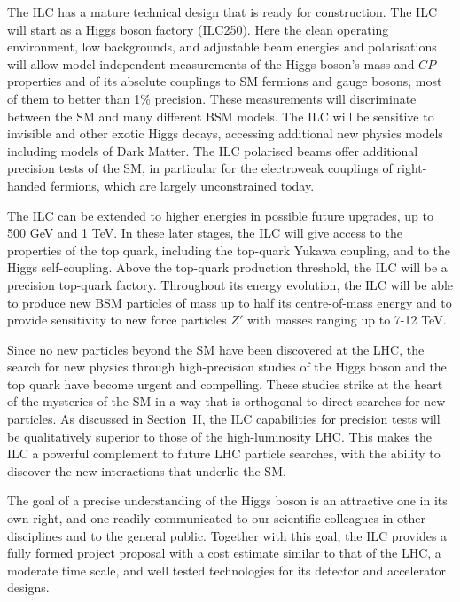 \documentclass[%
 reprint,
 amsmath,amssymb,
 aps,
]{revtex4-1}
\begin{document}
The ILC has a mature technical design
that is
 ready for construction. The ILC will start as a Higgs boson factory
 (ILC250).  Here the clean operating environment, low backgrounds, and
adjustable beam energies and polarisations will allow
model-independent 
measurements of the Higgs boson's mass and  $CP$ properties and of its
absolute couplings to SM fermions and gauge bosons, 
most of them to better than 1\% precision.  These measurements will
discriminate between the SM and many different BSM models.
The ILC will be sensitive to invisible and other exotic Higgs decays,
accessing additional new physics models including models of Dark
Matter.   The ILC polarised beams offer additional precision tests of
the SM, in particular for the electroweak couplings of right-handed
fermions, 
which are largely unconstrained today.


The ILC can be extended to higher energies in possible future
upgrades, up to 500 GeV and 1 TeV.  In these later stages, 
the ILC will give access to the properties of the top quark,
 including the top-quark Yukawa coupling, and  to the Higgs self-coupling.
Above  the top-quark production threshold,  the ILC will be
 a precision top-quark factory. Throughout its energy evolution,  the
 ILC will be able to produce new BSM particles of mass 
up to half its centre-of-mass energy and to  provide
 sensitivity to new force particles $Z'$ with masses ranging up to 7-12 TeV. 


Since no new particles beyond the SM have been 
discovered at the LHC, the search for new physics through
high-precision studies of the Higgs boson and  the top quark have
become
 urgent and compelling.  These studies strike at the heart of the
 mysteries of the SM in a way that is orthogonal to 
 direct searches for new particles.
 As discussed in Section~II, the ILC capabilities 
for precision tests
will be qualitatively superior  to those of the high-luminosity LHC. 
 This makes the ILC a powerful complement to  future LHC
 particle searches, with the ability to discover the new interactions that underlie the
 SM. 
 
The goal of a precise understanding of the Higgs boson is an attractive
one in its own right, and one readily communicated to our scientific
colleagues in other disciplines and to the general public.  Together
with this goal, the ILC provides a fully formed project proposal
with a  cost estimate
 similar to that of the LHC, a moderate time scale, and well tested
 technologies for its 
detector and accelerator designs. 
\end{document}
